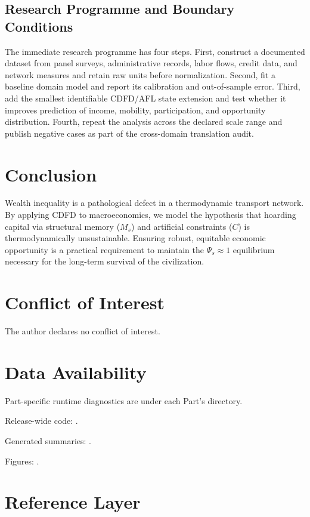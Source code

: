 \documentclass[11pt,a4paper]{article}
\begin{document}
\subsection{Research Programme and Boundary Conditions}

The immediate research programme has four steps. First, construct a documented
dataset from panel surveys, administrative records, labor flows, credit data, and network measures and retain raw units before normalization.
Second, fit a baseline domain model and report its calibration and out-of-sample
error. Third, add the smallest identifiable CDFD/AFL state extension and test
whether it improves prediction of income, mobility, participation, and opportunity distribution. Fourth, repeat the
analysis across the declared scale range and publish negative cases as part of
the cross-domain translation audit.


\section{Conclusion}
Wealth inequality is a pathological defect in a thermodynamic transport network. By applying CDFD to macroeconomics, we model the hypothesis that hoarding capital via structural memory ($M_s$) and artificial constraints ($C$) is thermodynamically unsustainable. Ensuring robust, equitable economic opportunity is a practical requirement to maintain the $\Psi_s \approx 1$ equilibrium necessary for the long-term survival of the civilization.
\section*{Conflict of Interest} The author declares no conflict of interest.
\section*{Data Availability}
Part-specific runtime diagnostics are under each Part's  directory.

Release-wide code: .

Generated summaries: .

Figures: .


\section{Reference Layer}


\end{document}
